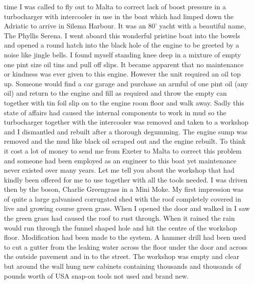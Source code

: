 time I was called to fly out to Malta to correct lack of boost pressure in a
turbocharger with intercooler in use in the boat which had limped down the
Adriatic to arrive in Silema Harbour.  It was an 80' yacht with a beautiful
name, The Phyllis Serena.  I went aboard this wonderful pristine boat into the
bowels and opened a round hatch into the black hole of the engine to be greeted
by a noise like jingle bells.  I found myself standing knee deep in a mixture
of empty one pint size oil tins and pull off slips.  It became apparent that no
maintenance or kindness was ever given to this engine.  However the unit
required an oil top up. Someone would find a car garage and purchase an armful
of one pint oil (any oil) and return to the engine and fill as required and
throw the empty can together with tin foil slip on to the engine room floor and
walk away.  Sadly this state of affairs had caused the internal components to
work in mud so the turbocharger together with the intercooler was removed and
taken to a workshop and I dismantled and rebuilt after a thorough degumming.
The engine sump was removed and the mud like black oil scraped out and the
engine rebuilt.  To think it cost a lot of money to send me from Exeter to
Malta to correct this problem and someone had been employed as an engineer to
this boat yet maintenance never existed over many years. Let me tell you about
the workshop that had kindly been offered for me to use together with all the
tools needed.  I was driven then by the boson, Charlie Greengrass in a Mini
Moke.  My first impression was of quite a large galvanised corrugated shed with
the roof completely covered in live and growing course green grass.  When I
opened the door and walked in I saw the green grass had caused the roof to rust
through.  When it rained the rain would run through the funnel shaped hole and
hit the centre of the workshop floor.  Modification had been made to the
system.  A hammer drill had been used to cut a gutter from the leaking water
across the floor under the door and across the outside pavement and in to the
street.  The workshop was empty and clear but around the wall hung new cabinets
containing thousands and thousands of pounds worth of USA snap-on tools not
used and brand new.
